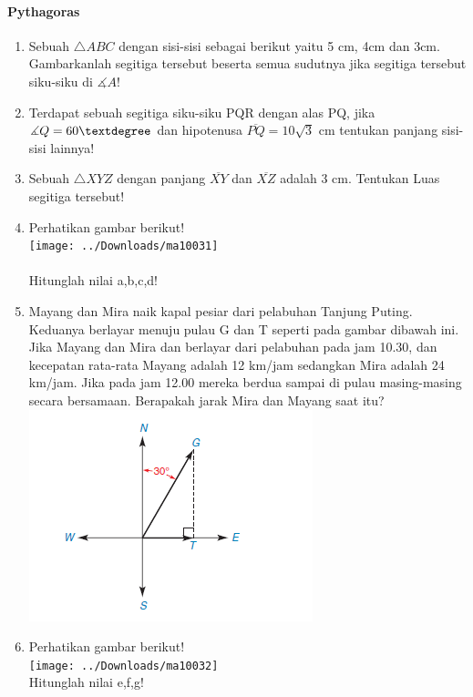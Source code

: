 \documentclass[12pt,a4paper]{exam}
\begin{document}
	\paragraph{Pythagoras}
	\begin{enumerate}
		\item Sebuah $\triangle ABC$ dengan sisi-sisi sebagai berikut yaitu 5 cm, 4cm dan 3cm. Gambarkanlah segitiga tersebut beserta semua sudutnya jika segitiga tersebut siku-siku di $\measuredangle A$!
		\item Terdapat sebuah segitiga siku-siku PQR dengan alas PQ, jika $\measuredangle Q=60\textdegree$ dan hipotenusa $\overline{PQ}=10\sqrt{3}$ cm
		tentukan panjang sisi-sisi lainnya!
		\item Sebuah $\triangle XYZ$ dengan panjang $\overline{XY}$ dan $\overline{XZ}$ adalah 3 cm. Tentukan Luas segitiga tersebut!
		\item Perhatikan gambar berikut!\\
			\texttt{[image: ../Downloads/ma10031]}\\
		\\
		Hitunglah nilai a,b,c,d!
		\item Mayang dan Mira naik kapal pesiar dari pelabuhan Tanjung Puting. Keduanya berlayar menuju pulau G dan T seperti pada gambar dibawah ini. Jika Mayang dan Mira dan  berlayar dari pelabuhan pada jam 10.30, dan kecepatan rata-rata Mayang adalah 12 km/jam sedangkan Mira adalah 24 km/jam. Jika pada jam 12.00 mereka berdua sampai di pulau masing-masing secara bersamaan. Berapakah jarak Mira dan Mayang saat itu? 
		\\
		\includegraphics[scale=1]{screenshot002}
		\item Perhatikan gambar berikut!\\
		\texttt{[image: ../Downloads/ma10032]}
		\\
		Hitunglah nilai e,f,g!


	\end{enumerate} 
\end{document}
